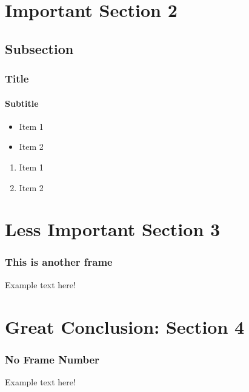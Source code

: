 \documentclass{beamer}
\begin{document}
\begin{frame}
\begin{center}
    \end{center}
\end{frame}


\section{Important Section 2}
\subsection{Subsection}
\begin{frame}
    \frametitle{Title}
    \framesubtitle{Subtitle}
    \begin{itemize}
        \item Item 1
        \item Item 2
    \end{itemize}
    \bigskip

    \begin{enumerate}
        \item Item 1
        \item Item 2
    \end{enumerate}
\end{frame}

\section{Less Important Section 3}
\begin{frame}
    \frametitle{This is another frame}
    \begin{center}
        Example text here!
    \end{center}
\end{frame}

\section{Great Conclusion: Section 4}
\begin{frame}[noframenumbering]
    \frametitle{No Frame Number}
    \begin{center}
        \Huge Example text here!
    \end{center}
\end{frame}
\end{document}
